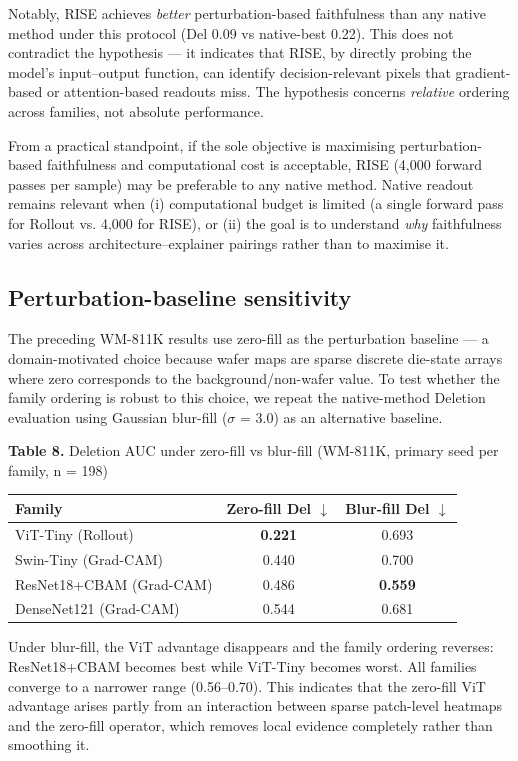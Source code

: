 \documentclass[11pt,a4paper]{article}
\begin{document}
Notably, RISE achieves \emph{better} perturbation-based faithfulness than any native method under this protocol (Del 0.09 vs native-best 0.22). This does not contradict the hypothesis --- it indicates that RISE, by directly probing the model's input--output function, can identify decision-relevant pixels that gradient-based or attention-based readouts miss. The hypothesis concerns \emph{relative} ordering across families, not absolute performance.

From a practical standpoint, if the sole objective is maximising perturbation-based faithfulness and computational cost is acceptable, RISE (4,000 forward passes per sample) may be preferable to any native method. Native readout remains relevant when (i) computational budget is limited (a single forward pass for Rollout vs. 4,000 for RISE), or (ii) the goal is to understand \emph{why} faithfulness varies across architecture--explainer pairings rather than to maximise it.


\subsection{Perturbation-baseline sensitivity}

The preceding WM-811K results use zero-fill as the perturbation baseline --- a domain-motivated choice because wafer maps are sparse discrete die-state arrays where zero corresponds to the background/non-wafer value. To test whether the family ordering is robust to this choice, we repeat the native-method Deletion evaluation using Gaussian blur-fill ($\sigma$ = 3.0) as an alternative baseline.

\begin{center}
\small \textbf{Table 8.} Deletion AUC under zero-fill vs blur-fill (WM-811K, primary seed per family, n = 198)
\end{center}

\begin{tabular}{lcc}
\toprule
Family & Zero-fill Del $\downarrow$ & Blur-fill Del $\downarrow$ \\
\midrule
ViT-Tiny (Rollout) & \textbf{0.221} & 0.693 \\
Swin-Tiny (Grad-CAM) & 0.440 & 0.700 \\
ResNet18+CBAM (Grad-CAM) & 0.486 & \textbf{0.559} \\
DenseNet121 (Grad-CAM) & 0.544 & 0.681 \\
\bottomrule
\end{tabular}


Under blur-fill, the ViT advantage disappears and the family ordering reverses: ResNet18+CBAM becomes best while ViT-Tiny becomes worst. All families converge to a narrower range (0.56--0.70). This indicates that the zero-fill ViT advantage arises partly from an interaction between sparse patch-level heatmaps and the zero-fill operator, which removes local evidence completely rather than smoothing it.
\end{document}
